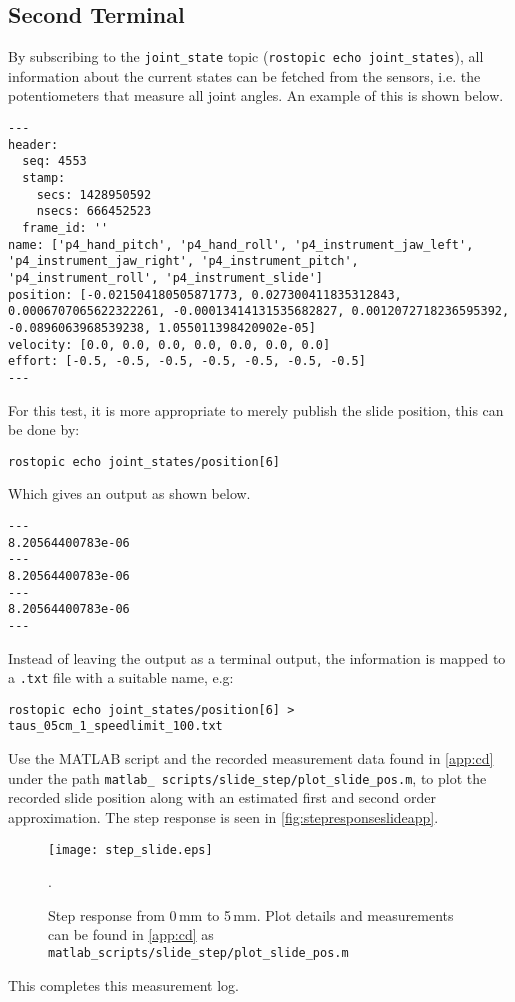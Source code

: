 \subsection*{Second Terminal}
By subscribing to the \texttt{joint\_state} topic (\texttt{rostopic echo joint\_states}), all information about the current states can be fetched from the sensors, i.e. the potentiometers that measure all joint angles. An example of this is shown below.
\begin{lstlisting}[style=DOS]
---
header: 
  seq: 4553
  stamp: 
    secs: 1428950592
    nsecs: 666452523
  frame_id: ''
name: ['p4_hand_pitch', 'p4_hand_roll', 'p4_instrument_jaw_left', 'p4_instrument_jaw_right', 'p4_instrument_pitch', 'p4_instrument_roll', 'p4_instrument_slide']
position: [-0.021504180505871773, 0.027300411835312843, 0.0006707065622322261, -0.00013414131535682827, 0.0012072718236595392, -0.0896063968539238, 1.055011398420902e-05]
velocity: [0.0, 0.0, 0.0, 0.0, 0.0, 0.0, 0.0]
effort: [-0.5, -0.5, -0.5, -0.5, -0.5, -0.5, -0.5]
---
\end{lstlisting}

For this test, it is more appropriate to merely publish the slide position, this can be done by:

\hspace{1cm}\texttt{rostopic echo joint\_states/position[6]}

Which gives an output as shown below.

\begin{lstlisting}[style=DOS]
---
8.20564400783e-06
---
8.20564400783e-06
---
8.20564400783e-06
---
\end{lstlisting}
Instead of leaving the output as a terminal output, the information is mapped to a \texttt{.txt} file with a suitable name, e.g:

\hspace{1cm} \texttt{rostopic echo joint\_states/position[6] > taus\_05cm\_1\_speedlimit\_100.txt}

Use the MATLAB script and the recorded measurement data found in \autoref{app:cd} under the path \texttt{matlab\_ scripts/slide\_step/plot\_slide\_pos.m}, to plot the recorded slide position along with an estimated first and second order approximation. The step response is seen in \autoref{fig:stepresponseslideapp}.
\begin{figure}[H]
\center
\texttt{[image: step\_slide.eps]}
\caption{Step response from 0\,mm to 5\,mm. Plot details and measurements can be found in \autoref{app:cd} as \texttt{matlab\_scripts/slide\_step/plot\_slide\_pos.m}}. 
\label{fig:stepresponseslideapp}
\end{figure}
This completes this measurement log.